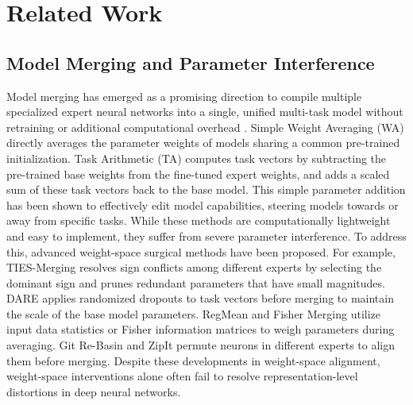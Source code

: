 \documentclass{article}
\theoremstyle{plain}
\theoremstyle{definition}
\theoremstyle{remark}
\begin{document}
\section{Related Work}
\label{sec:related}

\subsection{Model Merging and Parameter Interference}
Model merging has emerged as a promising direction to compile multiple specialized expert neural networks into a single, unified multi-task model without retraining or additional computational overhead \cite{wortsman2022model, wortsman2022robust}. Simple Weight Averaging (WA) directly averages the parameter weights of models sharing a common pre-trained initialization. Task Arithmetic (TA) \cite{ilharco2022editing} computes task vectors by subtracting the pre-trained base weights from the fine-tuned expert weights, and adds a scaled sum of these task vectors back to the base model. This simple parameter addition has been shown to effectively edit model capabilities, steering models towards or away from specific tasks. While these methods are computationally lightweight and easy to implement, they suffer from severe parameter interference. To address this, advanced weight-space surgical methods have been proposed. For example, TIES-Merging \cite{yadav2023ties} resolves sign conflicts among different experts by selecting the dominant sign and prunes redundant parameters that have small magnitudes. DARE \cite{yu2024dare} applies randomized dropouts to task vectors before merging to maintain the scale of the base model parameters. RegMean \cite{jin2022regmean} and Fisher Merging \cite{matena2022merging} utilize input data statistics or Fisher information matrices to weigh parameters during averaging. Git Re-Basin \cite{ainsworth2022git} and ZipIt \cite{stoica2023zipit} permute neurons in different experts to align them before merging. Despite these developments in weight-space alignment, weight-space interventions alone often fail to resolve representation-level distortions in deep neural networks.
\end{document}
